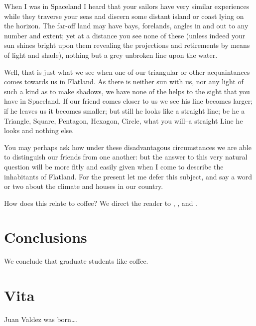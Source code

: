 \documentclass[edeposit,fullpage]{uiucthesis2014}
\begin{document}
When I was in Spaceland I heard that your sailors have very similar
experiences while they traverse your seas and discern some distant
island or coast lying on the horizon.  The far-off land may have bays,
forelands, angles in and out to any number and extent; yet at a
distance you see none of these (unless indeed your sun shines bright
upon them revealing the projections and retirements by means of light
and shade), nothing but a grey unbroken line upon the water.

Well, that is just what we see when one of our triangular or other
acquaintances comes towards us in Flatland.  As there is neither sun
with us, nor any light of such a kind as to make shadows, we have none
of the helps to the sight that you have in Spaceland.  If our friend
comes closer to us we see his line becomes larger; if he leaves us it
becomes smaller; but still he looks like a straight line; be he a
Triangle, Square, Pentagon, Hexagon, Circle, what you will--a straight
Line he looks and nothing else.

You may perhaps ask how under these disadvantagous circumstances we are
able to distinguish our friends from one another: but the answer to
this very natural question will be more fitly and easily given when I
come to describe the inhabitants of Flatland.  For the present let me
defer this subject, and say a word or two about the climate and houses
in our country.

How does this relate to coffee? We direct the reader to \cite{Trembly98}, \cite{Childish07}, and \cite{Presso10}.






\chapter{Conclusions}

We conclude that graduate students like coffee.

\appendix*



\backmatter




\chapter{Vita}

Juan Valdez was born\ldots.
\end{document}
